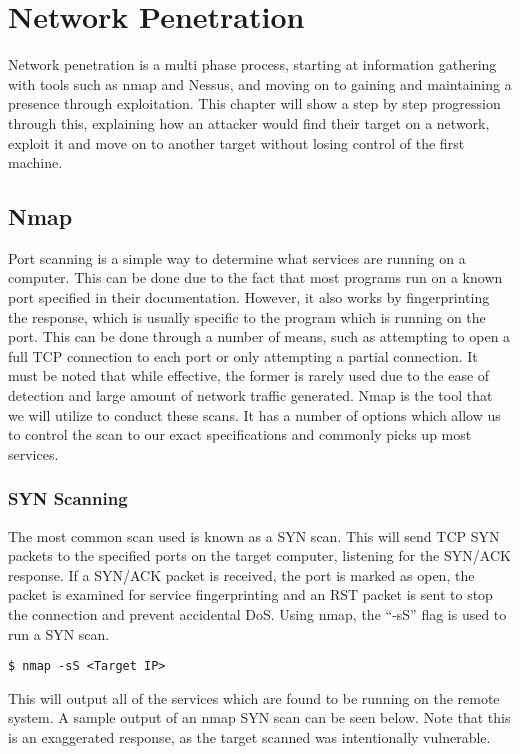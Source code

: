 \chapter{Network Penetration}
	\label{ch:NetworkPenetration}
	Network penetration is a multi phase process, starting at information gathering with tools such as nmap and Nessus, and moving on to gaining and maintaining a presence through exploitation.
	This chapter will show a step by step progression through this, explaining how an attacker would find their target on a network, exploit it and move on to another target without losing control of the first machine.
	\section{Nmap}
		Port scanning is a simple way to determine what services are running on a computer.
		This can be done due to the fact that most programs run on a known port specified in their documentation.
		However, it also works by fingerprinting the response, which is usually specific to the program which is running on the port.
		This can be done through a number of means, such as attempting to open a full TCP connection to each port or only attempting a partial connection.
		It must be noted that while effective, the former is rarely used due to the ease of detection and large amount of network traffic generated.
		Nmap\cite{NmapBook} is the tool that we will utilize to conduct these scans.
		It has a number of options which allow us to control the scan to our exact specifications and commonly picks up most services.\cite{HackingAOE}
		\subsection{SYN Scanning}
			The most common scan used is known as a SYN scan.
			This will send TCP SYN packets to the specified ports on the target computer, listening for the SYN/ACK response.
			If a SYN/ACK packet is received, the port is marked as open, the packet is examined for service fingerprinting and an RST packet is sent to stop the connection and prevent accidental DoS.
			Using nmap, the ``-sS'' flag is used to run a SYN scan.
			\begin{lstlisting}[style=CLI]
				$ nmap -sS <Target IP>
			\end{lstlisting}
			This will output all of the services which are found to be running on the remote system.
			A sample output of an nmap SYN scan can be seen below.
			Note that this is an exaggerated response, as the target scanned was intentionally vulnerable.
			

